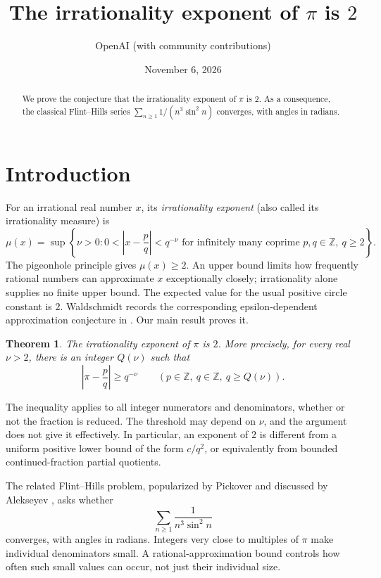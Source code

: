 \documentclass[11pt]{article}
\title{The irrationality exponent of \(\pi\) is \(2\)}
\author{OpenAI (with community contributions)}
\date{November 6, 2026}
\newcommand{\ZZ}{\mathbb Z}
\newtheorem{theorem}{Theorem}[section]
\theoremstyle{definition}
\theoremstyle{remark}
\numberwithin{equation}{section}
\begin{document}
\maketitle

\begin{abstract}
We prove the conjecture that the irrationality exponent of \(\pi\) is \(2\).
As a consequence, the classical Flint--Hills series
\(\sum_{n\ge1}1/(n^3\sin^2 n)\) converges, with angles in radians.
\end{abstract}

\section{Introduction}\label{sec:introduction}

For an irrational real number \(x\), its \emph{irrationality exponent}
(also called its irrationality measure) is
\[
\mu(x)=\sup\left\{\nu>0:
0<\left|x-\frac pq\right|<q^{-\nu}
\text{ for infinitely many coprime }p,q\in\ZZ,\ q\ge2\right\}.
\]
The pigeonhole principle gives \(\mu(x)\ge2\). An upper bound limits
how frequently rational numbers can approximate \(x\) exceptionally
closely; irrationality alone supplies no finite upper bound. The expected
value for the usual positive circle constant is \(2\). Waldschmidt
records the corresponding epsilon-dependent approximation conjecture
in \cite[p.~265]{waldschmidt}. Our main result proves it.

\begin{theorem}\label{thm:main}
The irrationality exponent of \(\pi\) is \(2\). More precisely, for every
real \(\nu>2\), there is an integer \(Q(\nu)\) such that
\[
\left|\pi-\frac pq\right|\ge q^{-\nu}
\qquad(p\in\ZZ,\ q\in\ZZ,\ q\ge Q(\nu)).
\]
\end{theorem}

The inequality applies to all integer numerators and denominators,
whether or not the fraction is reduced. The threshold may depend on
\(\nu\), and the argument does not give it effectively. In particular,
an exponent of \(2\) is different from a uniform positive lower bound
of the form \(c/q^2\), or equivalently from bounded continued-fraction
partial quotients.

The related Flint--Hills problem, popularized by Pickover and discussed
by Alekseyev \cite{alekseyev}, asks whether
\[
\sum_{n\ge1}\frac{1}{n^3\sin^2 n}
\]
converges, with angles in radians. Integers very close to multiples of
\(\pi\) make individual denominators small. A rational-approximation
bound controls how often such small values can occur, not just their
individual size.
\end{document}
